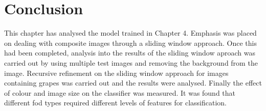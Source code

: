 \section{Conclusion}
This chapter has analysed the model trained in Chapter 4.
Emphasis was placed on dealing with composite images through a sliding window approach.
Once this had been completed, analysis into the results of the sliding window aproach was carried out by using multiple test images and removing the background from the image.
Recursive refinement on the sliding window approach for images containing grapes was carried out and the results were analysed.
Finally the effect of colour and image size on the classifier was measured.
It was found that different fod types required different levels of features for classification.
% 

